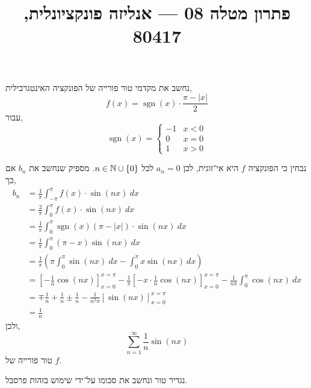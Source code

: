 
\title{פתרון מטלה 08 --- אנליזה פונקציונלית, 80417}

\DeclareMathOperator\sgn{sgn}


\maketitle
\maketitleprint[teal]

\question[2]
נחשב את מקדמי טור פורייה של הפונקציה האינטגרבילית,
\[
	f(x)
	= \sgn(x) \cdot \frac{\pi - |x|}{2}
\]
עבור,
\[
	\sgn(x)
	= \begin{cases}
		-1 & x < 0 \\
		0 & x = 0 \\
		1 & x > 0
	\end{cases}
\]
\begin{solution}
	נבחין כי הפונקציה $f$ היא אי־זוגית, לכן $a_n = 0$ לכל $n \in \mathbb{N} \cup \{ 0 \}$.
	מספיק שנחשב את $b_n$ אם כך,
	\begin{align*}
		b_n
		& = \frac{1}{\pi} \int_{-\pi}^{\pi} f(x) \cdot \sin(nx)\ dx \\
		& = \frac{2}{\pi} \int_{0}^{\pi} f(x) \cdot \sin(nx)\ dx \\
		& = \frac{1}{\pi} \int_{0}^{\pi} \sgn(x) (\pi - |x|) \cdot \sin(nx)\ dx \\
		& = \frac{1}{\pi} \int_{0}^{\pi} (\pi - x) \sin(nx)\ dx \\
		& = \frac{1}{\pi} \left( \pi \int_{0}^{\pi} \sin(nx)\ dx - \int_{0}^{\pi} x \sin(nx)\ dx \right) \\
		& = {\left[ -\frac{1}{n} \cos(nx) \right]}_{x = 0}^{x = \pi} - \frac{1}{\pi} {\left[ -x \cdot \frac{1}{n} \cos(nx) \right]}_{x = 0}^{x = \pi} - \frac{1}{n \pi} \int_{0}^{\pi} \cos(nx)\ dx  \\
		& = \mp \frac{1}{n} + \frac{1}{n} \pm \frac{1}{n} - \frac{1}{n^2 \pi} {\left[ \sin(nx) \right]}_{x = 0}^{x = \pi} \\
		& = \frac{1}{n}
	\end{align*}
	ולכן,
	\[
		\sum_{n = 1}^\infty \frac{1}{n} \sin(nx)
	\]
	טור פורייה של $f$.
\end{solution}

\question{}
נגדיר טור ונחשב את סכומו על־ידי שימוש בזהות פרסבל.

